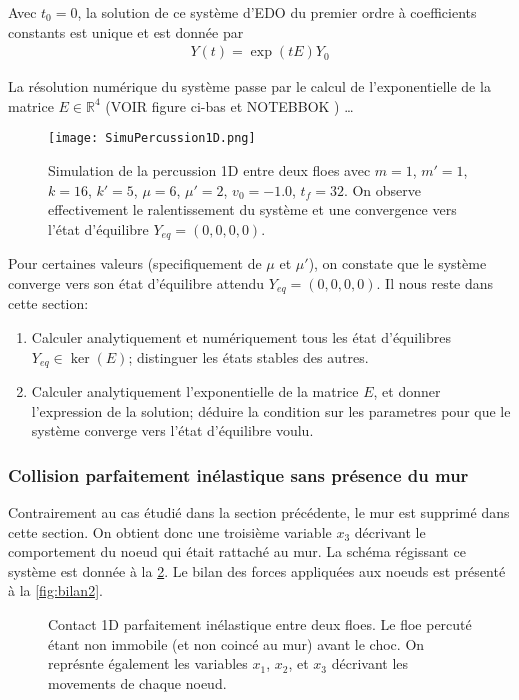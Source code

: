 \noindent Avec $t_0= 0$, la solution de ce système d'EDO du premier ordre à coefficients constants est unique et est donnée par
\begin{align}
    Y(t) = \exp(tE)Y_0
\end{align}

La résolution numérique du système passe par le calcul de l'exponentielle de la matrice $E \in  \mathbb{R}^4$ (VOIR figure ci-bas et NOTEBBOK ) \ldots
\begin{figure}[!h]
    \centering
    \texttt{[image: SimuPercussion1D.png]}
    \caption{Simulation de la percussion 1D entre deux floes avec $m=1$, $m'=1$, $k=16$, $k'=5$, $\mu=6$,
        $\mu'=2$, $v_0=-1.0$, $t_{f}=32$. On observe effectivement le ralentissement du système et une convergence
        vers l'état d'équilibre $Y_{eq}= (0,0,0,0)$.}
    \label{fig:simucontact1d}
\end{figure}

\noindent Pour certaines valeurs (specifiquement de $\mu$ et $\mu'$), on constate que le système converge vers son état d'équilibre attendu $Y_{eq} = (0,0,0,0)$. Il nous reste dans cette section:
\begin{enumerate}
    \item Calculer analytiquement et numériquement tous les état d'équilibres $Y_{eq} \in \ker(E)$; distinguer les états stables des autres.
    \item Calculer analytiquement l'exponentielle de la matrice $E$, et donner l'expression de la solution; déduire la condition sur les parametres pour que le système converge vers l'état d'équilibre voulu.
\end{enumerate} 




\subsubsection{Collision parfaitement inélastique sans présence du mur}

Contrairement au cas étudié dans la section précédente, le mur est supprimé dans cette section. On obtient donc une troisième variable $x_3$ décrivant le comportement du noeud qui était rattaché au mur. La schéma régissant ce système est donnée à la \cref{fig:contact1d2}. Le bilan des forces appliquées aux noeuds est présenté à la \cref{fig:bilan2}.

\begin{figure}[!h]
    \centering
    \caption{Contact 1D parfaitement inélastique entre deux floes. Le floe percuté étant non immobile (et non coincé au mur) avant le choc. On représnte également les variables $x_1$, $x_2$, et $x_3$ décrivant les movements de chaque noeud.}
    \label{fig:contact1d2}
\end{figure}

